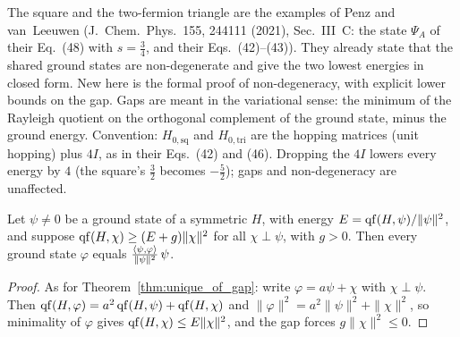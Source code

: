 The square and the two-fermion triangle are the examples of Penz and van~Leeuwen (J.~Chem.~Phys.\ 155,
244111 (2021), Sec.~III~C: the state $\Psi_A$ of their Eq.~(48) with $s=\tfrac34$, and their Eqs.~(42)--(43)).
They already state that the shared ground states are non-degenerate and give the two lowest energies in closed
form. New here is the formal proof of non-degeneracy, with explicit lower bounds on the gap. Gaps are meant in
the variational sense: the minimum of the Rayleigh quotient on the orthogonal complement of the ground state,
minus the ground energy. Convention: $H_{0,\mathrm{sq}}$ and $H_{0,\mathrm{tri}}$ are the hopping matrices
(unit hopping) plus $4I$, as in their Eqs.~(42) and (46). Dropping the $4I$ lowers every energy by $4$ (the
square's $\tfrac32$ becomes $-\tfrac52$); gaps and non-degeneracy are unaffected.

\begin{theorem}
  \label{thm:eq_smul_of_gap}
  \leanok
  Let $\psi\ne0$ be a ground state of a symmetric $H$, with energy $E=\operatorname{qf}(H,\psi)/\|\psi\|^2$, and suppose
  $\operatorname{qf}(H,\chi)\ge(E+g)\|\chi\|^2$ for all $\chi\perp\psi$, with $g>0$. Then every ground state $\varphi$ equals
  $\frac{\langle \psi, \varphi\rangle}{\|\psi\|^2}\,\psi$.
\end{theorem}
\begin{proof}
  \leanok
  As for Theorem~\ref{thm:unique_of_gap}: write $\varphi=a\psi+\chi$ with $\chi\perp\psi$. Then
  $\operatorname{qf}(H,\varphi)=a^2\operatorname{qf}(H,\psi)+\operatorname{qf}(H,\chi)$ and $\|\varphi\|^2=a^2\|\psi\|^2+\|\chi\|^2$, so minimality of
  $\varphi$ gives $\operatorname{qf}(H,\chi)\le E\|\chi\|^2$, and the gap forces $g\|\chi\|^2\le0$.
\end{proof}

